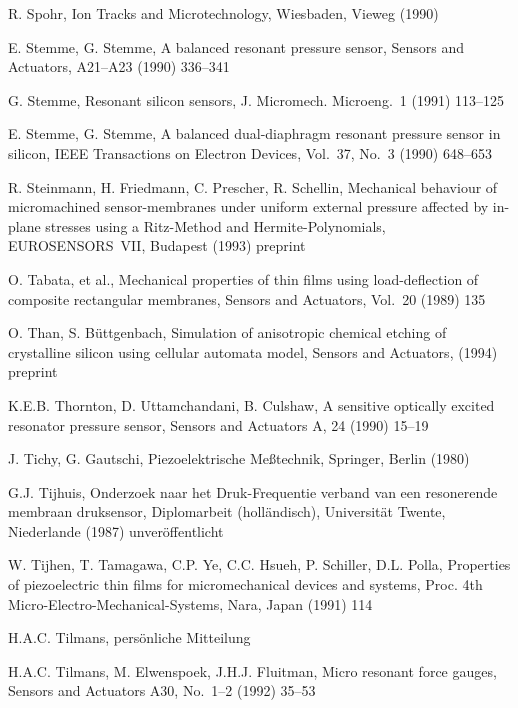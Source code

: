 \begin{thebibliography}{xxx}
 R. Spohr, Ion Tracks and Microtechnology, Wiesbaden, Vieweg (1990)

 E. Stemme, G. Stemme, A balanced resonant pressure sensor, Sensors and
 Actuators, A21--A23 (1990) 336--341

 G. Stemme, Resonant silicon sensors, J. Micromech. Microeng.~1 (1991)
 113--125

 E. Stemme, G. Stemme, A balanced dual-diaphragm resonant pressure sensor in
 silicon, IEEE Transactions on Electron Devices, Vol.~37, No.~3 (1990)
 648--653

 R. Steinmann, H. Friedmann, C. Prescher, R. Schellin, Mechanical behaviour
 of micromachined sensor-membranes under uniform external pressure affected
 by in-plane stresses using a Ritz-Method and Hermite-Polynomials,
 EUROSENSORS~VII, Budapest (1993) preprint

 O. Tabata, et al., Mechanical properties of thin films using load-deflection
 of composite rectangular membranes, Sensors and Actuators, Vol.~20 (1989)
 135

 O. Than, S. Büttgenbach, Simulation of anisotropic chemical etching of
 crystalline silicon using cellular automata model, Sensors and Actuators,
 (1994) preprint

 K.E.B. Thornton, D. Uttamchandani, B. Culshaw, A sensitive optically excited
 resonator pressure sensor, Sensors and Actuators A, 24 (1990) 15--19

 J. Tichy, G. Gautschi, Piezoelektrische Meßtechnik, Springer,
 Berlin (1980)

 G.J. Tijhuis, Onderzoek naar het Druk-Frequentie verband van een resonerende
 membraan druksensor, Diplomarbeit (holländisch), Universität Twente,
 Niederlande (1987) unveröffentlicht

 W. Tijhen, T. Tamagawa, C.P. Ye, C.C. Hsueh, P. Schiller, D.L. Polla,
 Properties of piezoelectric thin films for micromechanical devices and
 systems, Proc. 4th Micro-Electro-Mechanical-Systems, Nara, Japan (1991) 114

 H.A.C. Tilmans, persönliche Mitteilung

 H.A.C. Tilmans, M. Elwenspoek, J.H.J. Fluitman, Micro resonant force gauges,
 Sensors and Actuators A30, No.~1--2 (1992) 35--53


\end{thebibliography}
